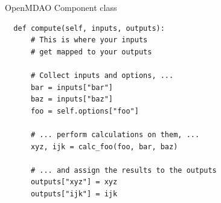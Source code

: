 \begin{frame}[fragile]{OpenMDAO Component class}
  \begin{lstlisting}
  def compute(self, inputs, outputs):
      # This is where your inputs
      # get mapped to your outputs

      # Collect inputs and options, ...
      bar = inputs["bar"]
      baz = inputs["baz"]
      foo = self.options["foo"]

      # ... perform calculations on them, ...
      xyz, ijk = calc_foo(foo, bar, baz)

      # ... and assign the results to the outputs
      outputs["xyz"] = xyz
      outputs["ijk"] = ijk
  \end{lstlisting}
\end{frame}
